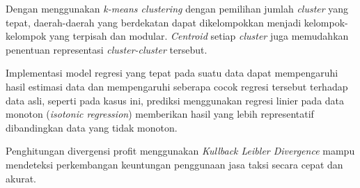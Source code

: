 \documentclass{article}
\begin{document}
Dengan menggunakan \textit{k-means clustering} dengan pemilihan jumlah \textit{cluster} yang tepat, daerah-daerah yang berdekatan dapat dikelompokkan menjadi kelompok-kelompok yang terpisah dan modular. \textit{Centroid} setiap \textit{cluster} juga memudahkan penentuan representasi \textit{cluster-cluster} tersebut.

Implementasi model regresi yang tepat pada suatu data dapat mempengaruhi hasil estimasi data dan mempengaruhi seberapa cocok regresi tersebut terhadap data asli, seperti pada kasus ini, prediksi menggunakan regresi linier pada data monoton (\textit{isotonic regression}) memberikan hasil yang lebih representatif dibandingkan data yang tidak monoton.

Penghitungan divergensi profit menggunakan \textit{Kullback Leibler Divergence} mampu mendeteksi perkembangan keuntungan penggunaan jasa taksi secara cepat dan akurat.
\end{document}
